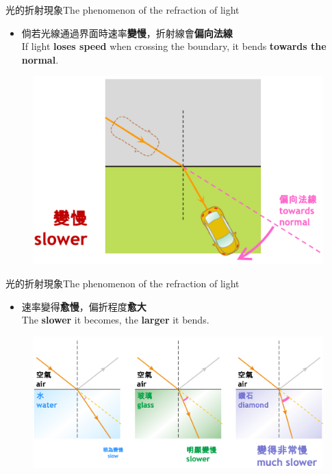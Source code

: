 \documentclass[beamer=true]{standalone}
\begin{document}
\begin{frame}{光的折射現象The phenomenon of the refraction of light}
\begin{itemize}
    \item 倘若光線通過界面時速率\textbf{變慢}，折射線會\textbf{偏向法線}\\If light \textbf{loses speed} when crossing the boundary, it bends \textbf{towards the normal}.
\end{itemize}
    \begin{figure}
        \centering
        \includegraphics[width=.8\linewidth]{assets/123812904821.png}
    \end{figure}
\end{frame}
\begin{frame}{光的折射現象The phenomenon of the refraction of light}
\begin{itemize}
    \item 速率變得\textbf{愈慢}，偏折程度\textbf{愈大}\\The \textbf{slower} it becomes, the \textbf{larger} it bends.
\end{itemize}
    \begin{figure}
        \centering
        \includegraphics[width=1\linewidth]{assets/129380913812921.png}
    \end{figure}
\end{frame}
\end{document}
